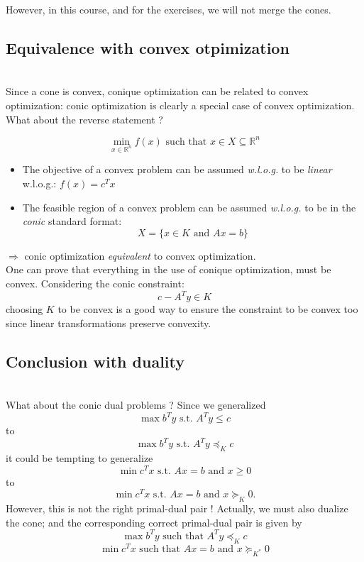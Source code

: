 \documentclass[10pt,a4paper]{article}
\begin{document}
\vspace{0.4cm}  \noindent However, in this course, and for the exercises, we will not merge the cones. \\

\noindent \subsection{Equivalence with convex otpimization} \\
\noindent Since a cone is convex, conique optimization can be related to convex optimization: conic optimization is clearly a special case of convex optimization. What about the reverse statement ?

\[ \min_{x \in \mathbb{R}^n} f(x) \text{ such that } x \in X \subseteq
\mathbb{R}^n \]

\begin{itemize}
\item The objective of a convex problem can be assumed
\emph{w.l.o.g.} to be \emph{linear} w.l.o.g.: $f(x) = c^T x$

\item The feasible region of a convex problem can be assumed
\emph{w.l.o.g.} to be in the \emph{conic} standard format: \[ X
= \{ x \in K \text{ and } A x = b \} \]
\end{itemize}

$\Rightarrow$ conic optimization \emph{equivalent} to convex
optimization. \\

\vspace{0.15cm}\noindent One can prove that everything in the use of conique optimization, must be convex. Considering the conic constraint: 
\begin{equation}
c-A^Ty \in K  \nonumber 
\end{equation}
choosing $K$ to be convex is a good way to ensure the constraint to be convex too since linear transformations preserve convexity. \\

\noindent \subsection{Conclusion with duality}\\
What about the conic dual problems ? Since we generalized
\[ \max b^T y \text{  s.t.  } A^T y \leq c \] to
\[ \max b^T y \text{  s.t.  } A^T y \preceq_K c \] it could be tempting to generalize
\[ \min c^T x \text{  s.t.  } Ax = b \text{ and } x \geq 0 \]
to
\[ \min c^T x \text{  s.t.  } Ax = b \text{ and } x \succeq_K 0 .\]
However, this is not the right primal-dual pair ! Actually, we must also dualize the cone; and the corresponding correct primal-dual pair is given by 
\vspace{0.3cm} \[ \max b^T y \text{ such that } A^T y \preceq_K c \]
\[ \min c^T x \text{ such that } Ax = b \text{ and } x \succeq_{K^*} 0 \]
\end{document}
